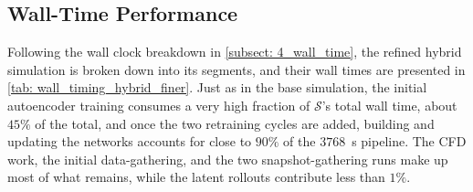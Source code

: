 \subsection{Wall-Time Performance}
\label{subsect: 4_finer_walltime}

Following the wall clock breakdown in \autoref{subsect: 4_wall_time}, the refined hybrid simulation is broken down into its segments, and their wall times are presented in \autoref{tab: wall_timing_hybrid_finer}. Just as in the base simulation, the initial autoencoder training consumes a very high fraction of $\mathcal{S} $'s total wall time, about $45\%$ of the total, and once the two retraining cycles are added, building and updating the networks accounts for close to $90\%$ of the $3768$~s pipeline. The CFD work, the initial data-gathering, and the two snapshot-gathering runs make up most of what remains, while the latent rollouts contribute less than $1\%$.

